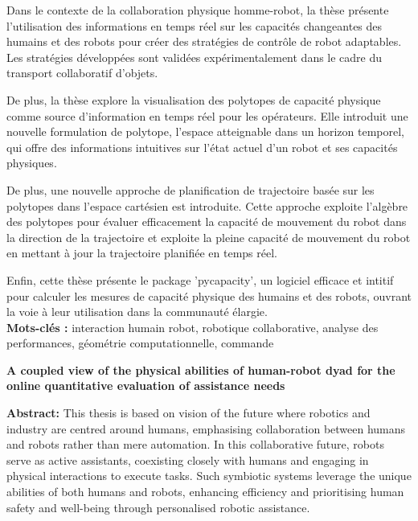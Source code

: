 \documentclass[french,12pt,a4paper]{report}
\begin{document}
\begin{small}
Dans le contexte de la collaboration physique homme-robot, la thèse présente l'utilisation des informations en temps réel sur les capacités changeantes des humains et des robots pour créer des stratégies de contrôle de robot adaptables. Les stratégies développées sont validées expérimentalement dans le cadre du transport collaboratif d'objets.

De plus, la thèse explore la visualisation des polytopes de capacité physique comme source d'information en temps réel pour les opérateurs. Elle introduit une nouvelle formulation de polytope, l'espace atteignable dans un horizon temporel, qui offre des informations intuitives sur l'état actuel d'un robot et ses capacités physiques.

De plus, une nouvelle approche de planification de trajectoire basée sur les polytopes dans l'espace cartésien est introduite. Cette approche exploite l'algèbre des polytopes pour évaluer efficacement la capacité de mouvement du robot dans la direction de la trajectoire et exploite la pleine capacité de mouvement du robot en mettant à jour la trajectoire planifiée en temps réel.

Enfin, cette thèse présente le package 'pycapacity', un logiciel efficace et intitif pour calculer les mesures de capacité physique des humains et des robots, ouvrant la voie à leur utilisation dans la communauté élargie.\\
\noindent\makebox[\linewidth]{\rule{\textwidth}{0.4pt}}
\textbf{Mots-clés :} interaction humain robot, robotique collaborative, analyse des performances, géométrie computationnelle, commande\\

\vspace*{\fill}
\newpage

\vspace*{\fill}
\begin{center}
\textbf{A coupled view of the physical abilities of human-robot dyad for the online quantitative evaluation of assistance needs}
\end{center}
\textbf{Abstract:} 
This thesis is based on vision of the future where robotics and industry are centred around humans, emphasising collaboration between humans and robots rather than mere automation. 
In this collaborative future, robots serve as active assistants, coexisting closely with humans and engaging in physical interactions to execute tasks. 
Such symbiotic systems leverage the unique abilities of both humans and robots, enhancing efficiency and prioritising human safety and well-being through personalised robotic assistance. 


\end{small}
\end{document}
